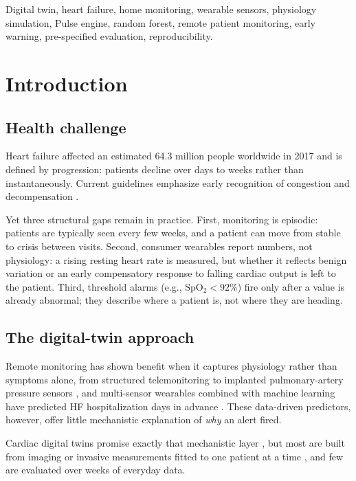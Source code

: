 \documentclass[conference]{IEEEtran}
\begin{document}
\begin{IEEEkeywords}
Digital twin, heart failure, home monitoring, wearable sensors, physiology simulation, Pulse engine, random forest, remote patient monitoring, early warning, pre-specified evaluation, reproducibility.
\end{IEEEkeywords}

\section{Introduction}\label{sec:intro}
\subsection{Health challenge}
Heart failure affected an estimated 64.3 million people worldwide in 2017 \cite{james2018gbd,savarese2023burden} and is defined by progression: patients decline over days to weeks rather than instantaneously. Current guidelines emphasize early recognition of congestion and decompensation \cite{heidenreich2022}.

Yet three structural gaps remain in practice. First, monitoring is episodic: patients are typically seen every few weeks, and a patient can move from stable to crisis between visits. Second, consumer wearables report numbers, not physiology: a rising resting heart rate is measured, but whether it reflects benign variation or an early compensatory response to falling cardiac output is left to the patient. Third, threshold alarms (e.g., SpO$_2<92\%$) fire only after a value is already abnormal; they describe where a patient is, not where they are heading.

\subsection{The digital-twin approach}
Remote monitoring has shown benefit when it captures physiology rather than symptoms alone, from structured telemonitoring \cite{inglis2008telemonitoring} to implanted pulmonary-artery pressure sensors \cite{abraham2011champion}, and multi-sensor wearables combined with machine learning have predicted HF hospitalization days in advance \cite{stehlik2020linkhf,gautam2022wearables}. These data-driven predictors, however, offer little mechanistic explanation of \emph{why} an alert fired.

Cardiac digital twins promise exactly that mechanistic layer \cite{corral2020twin,coorey2022twin,niederer2021scaling}, but most are built from imaging or invasive measurements fitted to one patient at a time \cite{gu2025hftwin,geddes2025rhftwin}, and few are evaluated over weeks of everyday data.
\end{document}
